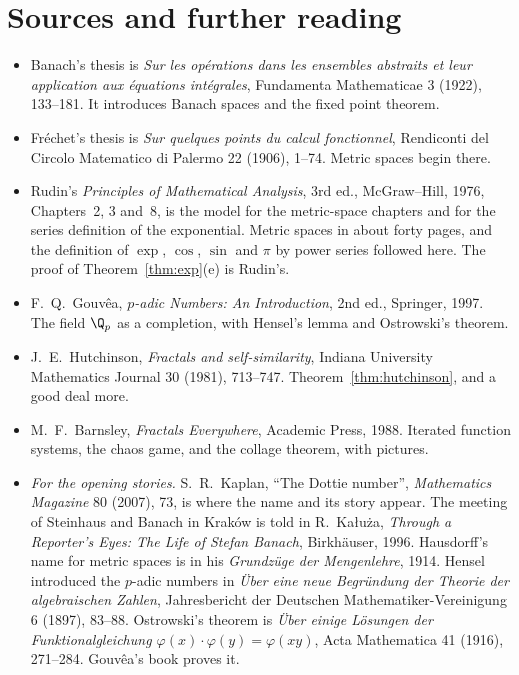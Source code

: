 \section*{Sources and further reading}

\begin{itemize}
\item Banach's thesis is \emph{Sur les op\'erations dans les ensembles abstraits et leur application aux \'equations int\'egrales}, Fundamenta Mathematicae 3 (1922), 133--181. It introduces Banach spaces and the fixed point theorem.
\item Fr\'echet's thesis is \emph{Sur quelques points du calcul fonctionnel}, Rendiconti del Circolo Matematico di Palermo 22 (1906), 1--74. Metric spaces begin there.
\item Rudin's \emph{Principles of Mathematical Analysis}, 3rd ed., McGraw--Hill, 1976, Chapters~2, 3 and~8, is the model for the metric-space chapters and for the series definition of the exponential. Metric spaces in about forty pages, and the definition of $\exp$, $\cos$, $\sin$ and $\pi$ by power series followed here. The proof of Theorem~\ref{thm:exp}(e) is Rudin's.
\item F.~Q.~Gouv\^ea, \emph{$p$-adic Numbers: An Introduction}, 2nd ed., Springer, 1997. The field $\Q_p$ as a completion, with Hensel's lemma and Ostrowski's theorem.
\item J.~E.~Hutchinson, \emph{Fractals and self-similarity}, Indiana University Mathematics Journal 30 (1981), 713--747. Theorem~\ref{thm:hutchinson}, and a good deal more.
\item M.~F.~Barnsley, \emph{Fractals Everywhere}, Academic Press, 1988. Iterated function systems, the chaos game, and the collage theorem, with pictures.
\item \emph{For the opening stories.} S.~R.~Kaplan, ``The Dottie number'', \emph{Mathematics Magazine} 80 (2007), 73, is where the name and its story appear. The meeting of Steinhaus and Banach in Krak\'ow is told in R.~Ka\l u\.za, \emph{Through a Reporter's Eyes: The Life of Stefan Banach}, Birkh\"auser, 1996. Hausdorff's name for metric spaces is in his \emph{Grundz\"uge der Mengenlehre}, 1914. Hensel introduced the $p$-adic numbers in \emph{\"Uber eine neue Begr\"undung der Theorie der algebraischen Zahlen}, Jahresbericht der Deutschen Mathematiker-Vereinigung 6 (1897), 83--88. Ostrowski's theorem is \emph{\"Uber einige L\"osungen der Funktionalgleichung $\varphi(x)\cdot\varphi(y)=\varphi(xy)$}, Acta Mathematica 41 (1916), 271--284. Gouv\^ea's book proves it.
\end{itemize}
